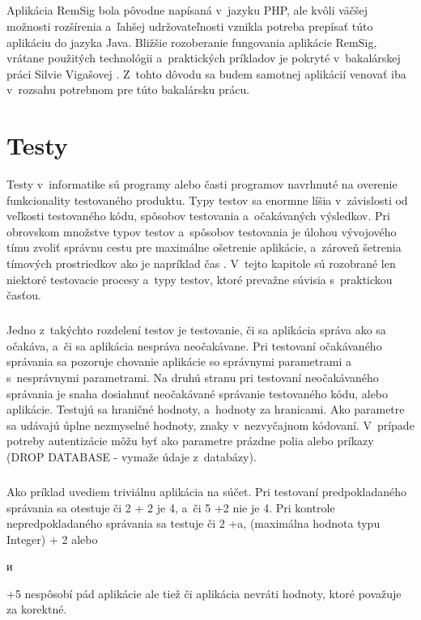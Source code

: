 \documentclass[
  digital, %
  table,   %
oneside,
  nolof,     %
  nolot,     %
]{fithesis3}
\begin{document}
\paragraph{}
Aplikácia RemSig bola pôvodne napísaná v~jazyku PHP, ale kvôli väčšej možnosti rozšírenia a~ľahšej udržovateľnosti \cite{javaVsPHP} vznikla potreba prepísať túto aplikáciu do jazyka Java.  Bližšie rozoberanie fungovania aplikácie RemSig, vrátane použitých technológii a~praktických príkladov je pokryté v~bakalárskej práci Silvie Vigašovej \cite{remsigSilvia}. Z~tohto dôvodu sa budem samotnej aplikácií venovať iba v~rozsahu potrebnom pre túto bakalársku prácu. 



\chapter{Testy}
Testy v~informatike sú programy alebo časti programov navrhnuté na overenie funkcionality testovaného produktu. Typy testov sa enormne líšia v~závislosti od veľkosti testovaného kódu, spôsobov testovania a~očakávaných výsledkov. Pri obrovskom množstve typov testov a~spôsobov testovania je úlohou vývojového tímu zvoliť správnu cestu pre maximálne ošetrenie aplikácie, a~zároveň šetrenia tímových prostriedkov ako je napríklad čas \cite{ssl}. V~tejto kapitole sú rozobrané len niektoré testovacie procesy a~typy testov, ktoré prevažne súvisia s~praktickou časťou.\paragraph{}
Jedno z~takýchto rozdelení testov je  testovanie, či sa aplikácia správa ako sa očakáva, a~či sa aplikácia nespráva neočakávane. Pri testovaní očakávaného správania sa pozoruje chovanie aplikácie so správnymi parametrami a~ s~nesprávnymi parametrami. Na druhú stranu pri testovaní neočakávaného správania je snaha dosiahnuť neočakávané správanie  testovaného kódu, alebo aplikácie. Testujú sa hraničné hodnoty, a~hodnoty za hranicami. Ako parametre sa udávajú úplne nezmyselné hodnoty, znaky v~nezvyčajnom kódovaní. V~prípade potreby autentizácie môžu byť ako parametre prázdne polia alebo príkazy (DROP DATABASE - vymaže údaje z~databázy). \paragraph{}
Ako príklad uvediem triviálnu aplikácia na súčet. Pri testovaní predpokladaného správania sa otestuje či 2 + 2 je 4, a~či 5 +2 nie je 4. Pri kontrole nepredpokladaného správania sa testuje či 2 +a, (maximálna hodnota typu Integer) + 2 alebo \begin{otherlanguage}{russian} и \end{otherlanguage}  +5   nespôsobí pád aplikácie ale tiež či aplikácia nevráti hodnoty, ktoré považuje za korektné. \paragraph{}
\end{document}
